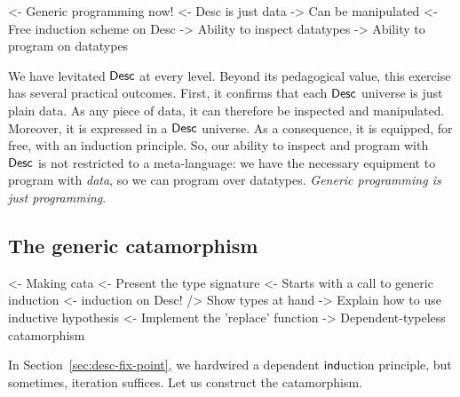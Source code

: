 \begin{wstructure}
<- Generic programming now!
    <- Desc is just data
        -> Can be manipulated
    <- Free induction scheme on Desc
        -> Ability to inspect datatypes
        -> Ability to program on datatypes
\end{wstructure}


We have levitated \(\Desc\) at every level. Beyond its pedagogical
value, this exercise has several practical outcomes. First, it
confirms that each $\Desc$ universe is just plain data. As any piece of
data, it can therefore be inspected and manipulated. Moreover, it is
expressed in a $\Desc$ universe. As a consequence, it is equipped,
for free, with an induction principle. So, our ability to inspect and
program with $\Desc$ is not restricted to a meta-language: we have
the necessary equipment to program with \emph{data}, so we can program over
datatypes. \emph{Generic programming is just programming}.


\subsection{The generic catamorphism}

\begin{wstructure}
<- Making cata
    <- Present the type signature
    <- Starts with a call to generic induction
        <- induction on Desc!
        /> Show types at hand
        -> Explain how to use inductive hypothesis
    <- Implement the 'replace' function
    -> Dependent-typeless catamorphism 
\end{wstructure}

In Section~\ref{sec:desc-fix-point}, we hardwired a dependent
$\F{ind}$uction principle, but sometimes,
iteration suffices. Let us construct the catamorphism.

\newcommand{\cata}{\F{cata}}

